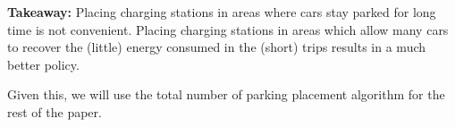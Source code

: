 \textbf{Takeaway:} Placing charging stations in areas where cars stay parked for long time is not convenient. Placing charging stations in areas which allow many cars to recover the (little) energy consumed in the (short) trips results in a much better policy.

Given this, we will use the total number of parking placement algorithm for the rest of the paper. 











